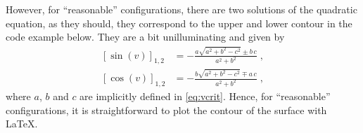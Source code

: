 \documentclass[a4paper,fleqn]{ltxdoc}
\begin{document}
However, for ``reasonable'' configurations, there are two solutions of the
quadratic equation, as they should, they correspond to the upper and lower
contour in the code example below. They are a bit unilluminating and given by
\begin{subequations}\label{eq:cvandsv}
\begin{align}
 [\sin(v)]_{1,2}&=-\frac{a \sqrt{a^2+b^2-c^2}\pm b\,c}{a^2+b^2}\;,\\
 [\cos(v)]_{1,2}&=-\frac{b \sqrt{a^2+b^2-c^2}\mp a\,c}{a^2+b^2}\;,
\end{align}
\end{subequations}
where $a$, $b$ and $c$ are implicitly defined in \eqref{eq:vcrit}. Hence, for
``reasonable'' configurations, it is straightforward to plot the contour of the
surface with \LaTeX.
\end{document}
